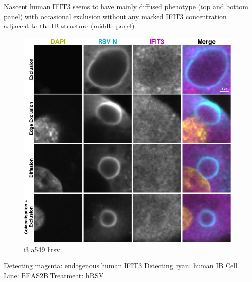 Nascent human IFIT3 seems to have mainly diffused phenotype (top and bottom panel) with occasional exclusion without any marked IFIT3 concentration adjacent to the IB structure (middle panel).

\begin{figure}
    \centering
    \includegraphics[width=1\linewidth]{09. Chapter 4/Figs/02. Infection/04. a549 i3.pdf}
    \caption[i3 a549 hrsv]{i3 a549 hrsv}
    \label{fig:i3 a549 hrsv}
\end{figure}

Detecting magenta: endogenous human IFIT3 \newline
Detecting cyan: human IB \newline
Cell Line: BEAS2B \newline
Treatment: hRSV \newline

